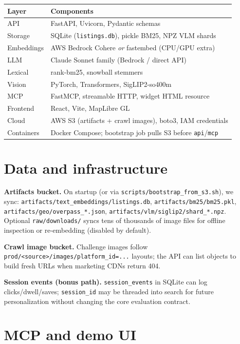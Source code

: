 \documentclass[11pt]{article}
\begin{document}
\begin{table}[h]
\centering
\small
\begin{tabular}{@{}ll@{}}
\toprule
\textbf{Layer} & \textbf{Components} \\
\midrule
API & FastAPI, Uvicorn, Pydantic schemas \\
Storage & SQLite (\texttt{listings.db}), pickle BM25, NPZ VLM shards \\
Embeddings & AWS Bedrock Cohere \textit{or} fastembed (CPU/GPU extra) \\
LLM & Claude Sonnet family (Bedrock / direct API) \\
Lexical & rank-bm25, snowball stemmers \\
Vision & PyTorch, Transformers, SigLIP2-so400m \\
MCP & FastMCP, streamable HTTP, widget HTML resource \\
Frontend & React, Vite, MapLibre GL \\
Cloud & AWS S3 (artifacts + crawl images), boto3, IAM credentials \\
Containers & Docker Compose; bootstrap job pulls S3 before \texttt{api}/\texttt{mcp} \\
\bottomrule
\end{tabular}
\end{table}

\section{Data and infrastructure}

\textbf{Artifacts bucket.} On startup (or via \texttt{scripts/bootstrap\_from\_s3.sh}), we sync: \texttt{artifacts/text\_embeddings/listings.db}, \texttt{artifacts/bm25/bm25.pkl}, \texttt{artifacts/geo/overpass\_*.json}, \texttt{artifacts/vlm/siglip2/shard\_*.npz}. Optional \texttt{raw/downloads/} syncs tens of thousands of image files for offline inspection or re-embedding (disabled by default).

\textbf{Crawl image bucket.} Challenge images follow \texttt{prod/<source>/images/platform\_id=...} layouts; the API can list objects to build fresh URLs when marketing CDNs return 404.

\textbf{Session events (bonus path).} \texttt{session\_events} in SQLite can log clicks/dwell/saves; \texttt{session\_id} may be threaded into search for future personalization without changing the core evaluation contract.

\section{MCP and demo UI}
\end{document}
